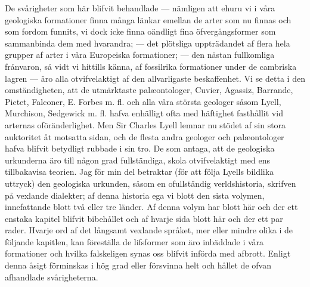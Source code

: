 De svårigheter som här blifvit behandlade — nämligen att ehuru vi i våra geologiska formationer finna många länkar emellan de arter som nu finnas och som fordom funnits, vi dock icke finna oändligt fina öfvergångsformer som sammanbinda dem med hvarandra; — det plötsliga uppträdandet af flera hela grupper af arter i våra Europeiska formationer; — den nästan fullkomliga frånvaron, så vidt vi hittills känna, af fossilrika formationer under de cambriska lagren — äro alla otvifvelaktigt af den allvarligaste beskaffenhet. Vi se detta i den omständigheten, att de utmärktaste palæontologer, Cuvier, Agassiz, Barrande, Pictet, Falconer, E. Forbes m. fl. och alla våra största geologer såsom Lyell, Murchison, Sedgewick m. fl. hafva enhälligt ofta med häftighet fasthållit vid arternas oföränderlighet. Men Sir Charles Lyell lemnar nu stödet af sin stora auktoritet åt motsatta sidan, och de flesta andra geologer och palæontologer hafva blifvit betydligt rubbade i sin tro. De som antaga, att de geologiska urkunderna äro till någon grad fullständiga, skola otvifvelaktigt med ens tillbakavisa teorien. Jag för min del betraktar (för att följa Lyells bildlika uttryck) den geologiska urkunden, såsom en ofullständig verldshistoria, skrifven på vexlande dialekter; af denna historia ega vi blott den sista volymen, innefattande blott två eller tre länder. Af denna volym har blott här och der ett enstaka kapitel blifvit bibehållet och af hvarje sida blott här och der ett par rader. Hvarje ord af det långsamt vexlande språket, mer eller mindre olika i de följande kapitlen, kan föreställa de lifsformer som äro inbäddade i våra formationer och hvilka falskeligen synas oss blifvit införda med afbrott. Enligt denna åsigt förminskas i hög grad eller försvinna helt och hållet de ofvan afhandlade svårigheterna.


